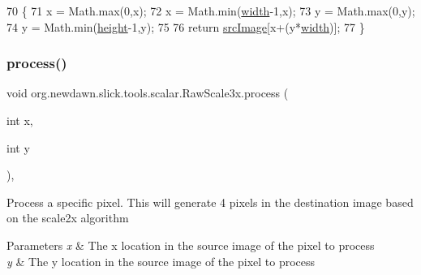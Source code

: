 \begin{DoxyCode}
70     \{
71         x = Math.max(0,x);
72         x = Math.min(\mbox{\hyperlink{classorg_1_1newdawn_1_1slick_1_1tools_1_1scalar_1_1_raw_scale3x_a755ece4afefc43bbcd0e0b7757e20ce2}{width}}-1,x);
73         y = Math.max(0,y);
74         y = Math.min(\mbox{\hyperlink{classorg_1_1newdawn_1_1slick_1_1tools_1_1scalar_1_1_raw_scale3x_a67f5f9e7b2f4e0be9915463c29eb1b7d}{height}}-1,y);
75         
76         \textcolor{keywordflow}{return} \mbox{\hyperlink{classorg_1_1newdawn_1_1slick_1_1tools_1_1scalar_1_1_raw_scale3x_a63a783ac3e746edbd747992b581f8e52}{srcImage}}[x+(y*\mbox{\hyperlink{classorg_1_1newdawn_1_1slick_1_1tools_1_1scalar_1_1_raw_scale3x_a755ece4afefc43bbcd0e0b7757e20ce2}{width}})];
77     \}
\end{DoxyCode}
\mbox{\label{classorg_1_1newdawn_1_1slick_1_1tools_1_1scalar_1_1_raw_scale3x_ad2246ebbbbf59dcc24453071bb99edfa}} 
\subsubsection{\texorpdfstring{process()}{process()}}
{\footnotesize\ttfamily void org.\+newdawn.\+slick.\+tools.\+scalar.\+Raw\+Scale3x.\+process (\begin{DoxyParamCaption}\item[{int}]{x,  }\item[{int}]{y }\end{DoxyParamCaption})\hspace{0.3cm}{\ttfamily [inline]}, {\ttfamily [private]}}

Process a specific pixel. This will generate 4 pixels in the destination image based on the scale2x algorithm


\begin{DoxyParams}{Parameters}
{\em x} & The x location in the source image of the pixel to process \\
\hline
{\em y} & The y location in the source image of the pixel to process \\
\hline
\end{DoxyParams}

